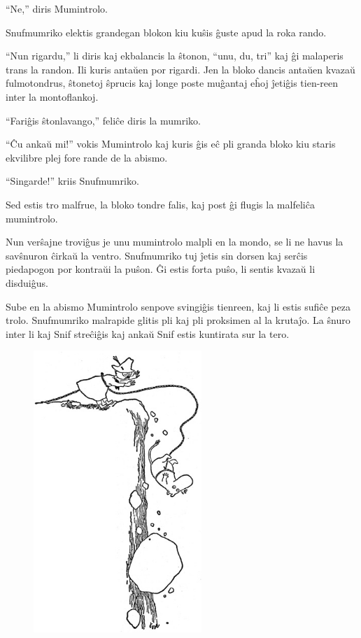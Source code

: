 ``Ne,'' diris Mumintrolo.

Snufmumriko elektis grandegan blokon kiu kuŝis ĝuste apud la roka rando.

``Nun rigardu,'' li diris kaj ekbalancis la ŝtonon, ``unu, du, tri'' kaj ĝi malaperis trans la randon. Ili kuris antaŭen por rigardi. Jen la bloko dancis antaŭen kvazaŭ fulmotondrus, ŝtonetoj ŝprucis kaj longe poste muĝantaj eĥoj ĵetiĝis tien-reen inter la montoflankoj.

``Fariĝis ŝtonlavango,'' feliĉe diris la mumriko.

``Ĉu ankaŭ mi!'' vokis Mumintrolo kaj kuris ĝis eĉ pli granda bloko kiu staris ekvilibre plej fore rande de la abismo.

``Singarde!'' kriis Snufmumriko.

Sed estis tro malfrue, la bloko tondre falis, kaj post ĝi flugis la malfeliĉa mumintrolo.

Nun verŝajne troviĝus je unu mumintrolo malpli en la mondo, se li ne havus la savŝnuron ĉirkaŭ la ventro. Snufmumriko tuj ĵetis sin dorsen kaj serĉis piedapogon por kontraŭi la puŝon. Ĝi estis forta puŝo, li sentis kvazaŭ li disduiĝus.

Sube en la abismo Mumintrolo senpove svingiĝis tienreen, kaj li estis sufiĉe peza trolo. Snufmumriko malrapide glitis pli kaj pli proksimen al la krutaĵo. La ŝnuro inter li kaj Snif streĉiĝis kaj ankaŭ Snif estis kuntirata sur la tero.

\begin{figure}[htbp]
\centering
\includegraphics[width=180pt,height=302pt]{5-2.png}
\caption{}
\label{5-2}
\end{figure}

